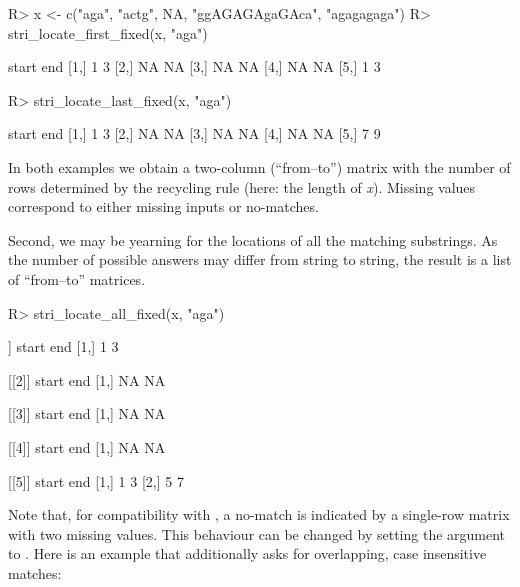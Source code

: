 \documentclass[nojss]{jss}
\begin{document}
\begin{Schunk}
\begin{Sinput}
R> x <- c("aga", "actg", NA, "ggAGAGAgaGAca", "agagagaga")
R> stri_locate_first_fixed(x, "aga")
\end{Sinput}
\begin{Soutput}
     start end
[1,]     1   3
[2,]    NA  NA
[3,]    NA  NA
[4,]    NA  NA
[5,]     1   3
\end{Soutput}
\begin{Sinput}
R> stri_locate_last_fixed(x, "aga")
\end{Sinput}
\begin{Soutput}
     start end
[1,]     1   3
[2,]    NA  NA
[3,]    NA  NA
[4,]    NA  NA
[5,]     7   9
\end{Soutput}
\end{Schunk}

\noindent
In both examples we obtain a two-column (``from--to'') matrix
with the number of rows determined by the recycling rule (here:
the length of \textit{x}).
Missing values correspond to either missing inputs or
no-matches.

Second, we may be yearning for the locations of all the matching
substrings. As the number of possible answers may differ from string to string,
the result is a list of ``from--to'' matrices.

\begin{Schunk}
\begin{Sinput}
R> stri_locate_all_fixed(x, "aga")
\end{Sinput}
\begin{Soutput}
[[1]]
     start end
[1,]     1   3

[[2]]
     start end
[1,]    NA  NA

[[3]]
     start end
[1,]    NA  NA

[[4]]
     start end
[1,]    NA  NA

[[5]]
     start end
[1,]     1   3
[2,]     5   7
\end{Soutput}
\end{Schunk}

\noindent
Note that, for compatibility with , a no-match is
indicated by a single-row matrix with two missing values.
This behaviour can be changed by setting the 
argument to . Here is an example that additionally
asks for overlapping, case insensitive matches:
\end{document}
